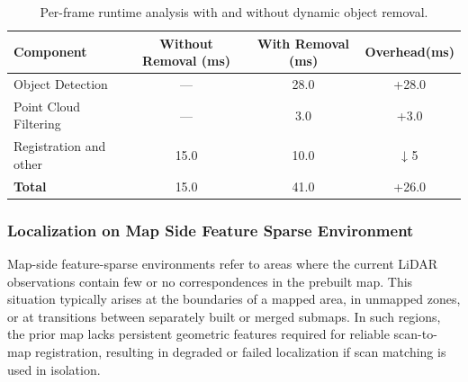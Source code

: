 \begin{table}[H]
	\centering
	\renewcommand{\arraystretch}{0.3}
	\setlength{\tabcolsep}{3pt}
	\caption{Per-frame runtime analysis with and without dynamic object removal.}
	\label{tab:dynamic_object_runtime_pipeline_comparison}
	\begin{tabular}{lccc}
		\toprule
		\textbf{Component} & \textbf{Without Removal (ms)} & \textbf{With Removal (ms)} & \textbf{Overhead(ms)} \\
		\midrule
		Object Detection         & —     & 28.0  & +28.0 \\
		Point Cloud Filtering    & —     & 3.0   & +3.0 \\
		Registration and other   & 15.0  & 10.0   & ↓ 5 \\
		\midrule
		\textbf{Total}           & 15.0  & 41.0  & +26.0 \\
		\bottomrule
	\end{tabular}
\end{table}



\subsubsection{Localization on Map Side Feature Sparse Environment}

Map-side feature-sparse environments refer to areas where the current LiDAR observations contain few or no correspondences in the prebuilt map. This situation typically arises at the boundaries of a mapped area, in unmapped zones, or at transitions between separately built or merged submaps. In such regions, the prior map lacks persistent geometric features required for reliable scan-to-map registration, resulting in degraded or failed localization if scan matching is used in isolation.

